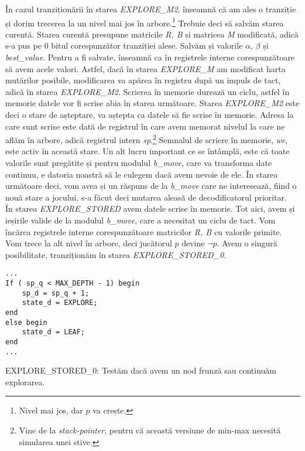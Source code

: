 \documentclass[12pt,twoside,a4paper,fleqn]{book}
\theoremstyle{definition}
\begin{document}
În cazul tranziționării în starea \emph{EXPLORE\_M2}, înseamnă că am ales o tranziție și dorim trecerea la un nivel mai jos în arbore.\footnote{Nivel mai jos, dar $p$ va crește.} Trebuie deci să salvăm starea curentă. Starea curentă presupune matricile \emph{R, B} și matricea \emph{M} modificată, adică s-a pus pe $0$ bitul corespunzător tranziției alese. Salvăm și valorile $\alpha$, $\beta$ și \emph{best\_value}. Pentru a fi salvate, înseamnă ca în registrele interne corespunzătoare să avem acele valori. Astfel, dacă în starea \emph{EXPLORE\_M} am modificat harta mutărilor posibile, modificarea va apărea în registru după un impuls de tact, adică în starea \emph{EXPLORE\_M2}. Scrierea în memorie durează un ciclu, astfel în memorie datele vor fi scrise abia în starea următoare. Starea \emph{EXPLORE\_M2} este deci o stare de așteptare, va aștepta ca datele să fie scrise în memorie. Adresa la care sunt scrise este dată de registrul în care avem memorat nivelul la care ne aflăm în arbore, adică registrul intern \emph{sp}.\footnote{Vine de la \emph{stack-pointer}, pentru că această versiune de min-max necesită simularea unei stive.} Semnalul de scriere în memorie, \emph{we}, este activ în această stare. Un alt lucru important ce se întâmplă, este că toate valorile sunt pregătite și pentru modulul \emph{b\_move}, care va transforma date continuu, e datoria noastră să le culegem dacă avem nevoie de ele. În starea următoare deci, vom avea și un răspuns de la \emph{b\_move} care ne interesează, fiind o nouă stare a jocului, s-a făcut deci mutarea aleasă de decodificatorul prioritar.\\
În starea \emph{EXPLORE\_STORED} avem datele scrise în memorie. Tot aici, avem și ieșirile valide de la modulul \emph{b\_move}, care a necesitat un ciclu de tact. Vom încărca registrele interne corespunzătoare matricilor \emph{R, B} cu valorile primite. Vom trece la alt nivel în arbore, deci jucătorul $p$ devine $\lnot p$. Avem o singură posibilitate, tranziționăm în starea \emph{EXPLORE\_STORED\_0}.
\begin{fragmentsursa}
\begin{scriptsize}
\begin{verbatim}
...
If ( sp_q < MAX_DEPTH - 1) begin
    sp_d = sp_q + 1;
    state_d = EXPLORE;
end
else begin
    state_d = LEAF;
end
...
\end{verbatim}
\end{scriptsize}
\caption{EXPLORE\_STORED\_0: Testăm dacă avem un nod frunză sau continuăm explorarea.}
\label{frag_minmax2}
\end{fragmentsursa}
\end{document}
